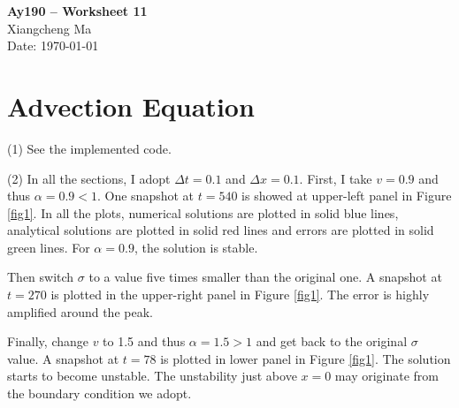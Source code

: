\documentclass[11pt,letterpaper]{article}
\begin{document}
\begin{center}
\Large
{\bf Ay190 -- Worksheet 11} \\
\large
Xiangcheng Ma \\
Date: \today
\end{center}

\section*{Advection Equation}
(1) See the implemented code.

(2) In all the sections, I adopt $\Delta t=0.1$ and $\Delta x=0.1$. First, I take $v=0.9$ and thus $\alpha=0.9<1$. One snapshot at $t=540$ is showed at upper-left panel in Figure \ref{fig1}. In all the plots, numerical solutions are plotted in solid blue lines, analytical solutions are plotted in solid red lines and errors are plotted in solid green lines. For $\alpha=0.9$, the solution is stable.

Then switch $\sigma$ to a value five times smaller than the original one. A snapshot at $t=270$ is plotted in the upper-right panel in Figure \ref{fig1}. The error is highly amplified around the peak.

Finally, change $v$ to 1.5 and thus $\alpha=1.5>1$ and get back to the original $\sigma$ value. A snapshot at $t=78$ is plotted in lower panel in Figure \ref{fig1}. The solution starts to become unstable. The unstability just above $x=0$ may originate from the boundary condition we adopt.
\end{document}
